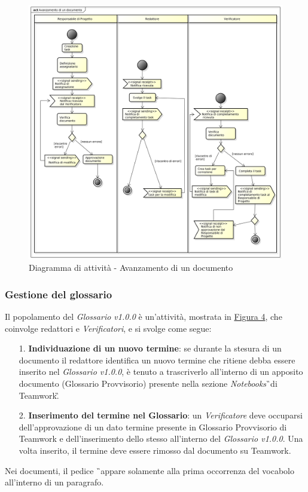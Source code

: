 \begin{figure}[htbp]
\centering
\includegraphics[scale=0.4]{immagini/avanzamento_documento.png}
\captionsetup{labelfont=bf}
\caption{Diagramma di attività - Avanzamento di un documento}\label{sec:Figura3}
\end{figure}

\subsubsection{Gestione del glossario}
Il popolamento del \textit{Glossario v1.0.0} è un'attività, mostrata in \hyperref[sec:Figura4]{Figura 4}, che coinvolge redattori e \textit{Verificatori}, e si svolge come segue:
\begin{itemize}
	\item [1.] {\textbf{Individuazione di un nuovo termine}}: se durante la stesura di un documento il redattore identifica un nuovo termine che ritiene debba essere inserito nel \textit{Glossario v1.0.0}, è tenuto a trascriverlo all'interno di un apposito documento (Glossario Provvisorio) presente nella sezione \textit{Notebooks}\G\ di Teamwork\G.
	\item [2.] {\textbf{Inserimento del termine nel Glossario}}: un \textit{Verificatore} deve occuparsi dell'approvazione di un dato termine presente in Glossario Provvisorio di Teamwork e dell'inserimento dello stesso all'interno del \textit{Glossario v1.0.0}. Una volta inserito, il termine deve essere rimosso dal documento su Teamwork.
\end{itemize}
 Nei documenti, il pedice \G\ appare solamente alla prima occorrenza del vocabolo all'interno di un paragrafo.

